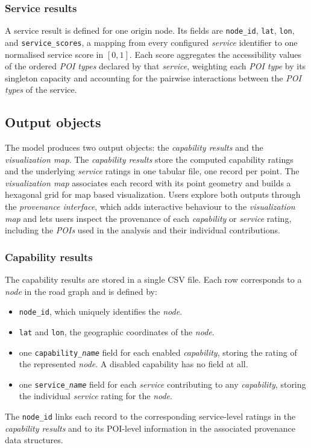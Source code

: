 \documentclass{article}
\begin{document}
\subsubsection*{Service results}
    A service result is defined for one origin node. Its fields are
    \texttt{node\_id}, \texttt{lat}, \texttt{lon}, and \texttt{service\_scores},
    a mapping from every configured \emph{service} identifier to one normalised
    service score in $[0,1]$. Each score aggregates the accessibility values of
    the ordered \emph{POI types} declared by that \emph{service}, weighting each
    \emph{POI type} by its singleton capacity and accounting for the pairwise
    interactions between the \emph{POI types} of the service.


\subsection{Output objects}
The model produces two output objects: the \emph{capability results} and the \emph{visualization map}. The \emph{capability results} store the computed capability ratings and the underlying \emph{service} ratings in one tabular file, one record per point. The \emph{visualization map} associates each record with its point geometry and builds a hexagonal grid for map based visualization. Users explore both outputs through the \emph{provenance interface}, which adds interactive behaviour to the \emph{visualization map} and lets users inspect the provenance of each \emph{capability} or \emph{service} rating, including the \emph{POIs} used in the analysis and their individual contributions.
\subsubsection*{Capability results}
The capability results are stored in a single CSV file. Each row corresponds to a \emph{node} in the road graph and is defined by:
\begin{itemize}
    \item \texttt{node\_id}, which uniquely identifies the \emph{node}.
    \item \texttt{lat} and \texttt{lon}, the geographic coordinates of the \emph{node}.
    \item one \texttt{capability\_\textnormal{\emph{name}}} field for each enabled \emph{capability}, storing the rating of the represented \emph{node}. A disabled capability has no field at all.
    \item one \texttt{service\_\textnormal{\emph{name}}} field for each \emph{service} contributing to any \emph{capability}, storing the individual \emph{service} rating for the \emph{node}.
\end{itemize}
The \texttt{node\_id} links each record to the corresponding service-level ratings in the \emph{capability results} and to its POI-level information in the associated provenance data structures.
\end{document}
